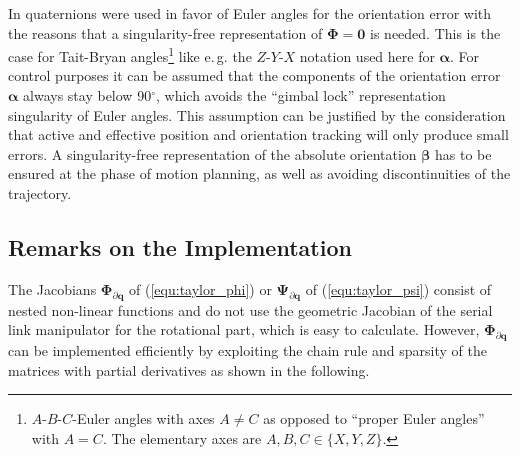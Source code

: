 \documentclass{svproc}
\newcommand{\bm}[1]{\boldsymbol{#1}}
\begin{document}
In \cite{Zlajpah2017} quaternions were used in favor of Euler angles for the orientation error with the reasons that a singularity-free representation of $\bm{\Phi}=\bm{0}$ is needed.
This is the case for Tait-Bryan angles\footnote{$A$-$B$-$C$-Euler angles with axes $A \ne C$ as opposed to ``proper Euler angles'' with $A = C$. The elementary axes are $A,B,C \in \{ X,Y,Z\}$.} like e.\,g. the $Z$-$Y$-$X$ notation used here for $\bm{\alpha}$.
For control purposes it can be assumed that the components of the orientation error $\bm{\alpha}$ always stay below 90$^\circ$, which avoids the ``gimbal lock'' representation singularity of Euler angles.
This assumption can be justified by the consideration that active and effective position and orientation tracking will only produce small errors.
A singularity-free representation of the absolute orientation $\bm{\beta}$ has to be ensured at the phase of motion planning, as well as avoiding discontinuities of the trajectory.

\subsection{Remarks on the Implementation}
\label{sec:RecEulAng_implement}

The Jacobians $\bm{\Phi}_{\partial\bm{q}}$ of (\ref{equ:taylor_phi}) or $\bm{\Psi}_{\partial\bm{q}}$ of (\ref{equ:taylor_psi}) consist of nested non-linear functions and do not use the geometric Jacobian of the serial link manipulator for the rotational part, which is easy to calculate. 
%
However, $\bm{\Phi}_{\partial\bm{q}}$ can be implemented efficiently by exploiting the chain rule and sparsity of the matrices with partial derivatives as shown in the following.
\end{document}
